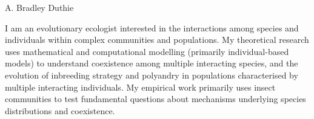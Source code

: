 \documentclass[letterpaper]{article}
\def\name{A. Bradley Duthie}
\begin{document}
\thispagestyle{specialfooter}


{\Huge \name}

\hrulefill

\vspace{0.06in}


I am an evolutionary ecologist interested in the interactions among species and individuals within complex communities and populations. My theoretical research uses mathematical and computational modelling (primarily individual-based models) to understand coexistence among multiple interacting species, and the evolution of inbreeding strategy and polyandry in populations characterised by multiple interacting individuals. My empirical work primarily uses insect communities to test fundamental questions about mechanisms underlying species distributions and coexistence. %



\hrulefill

\vspace{0.25in}

\end{document}
